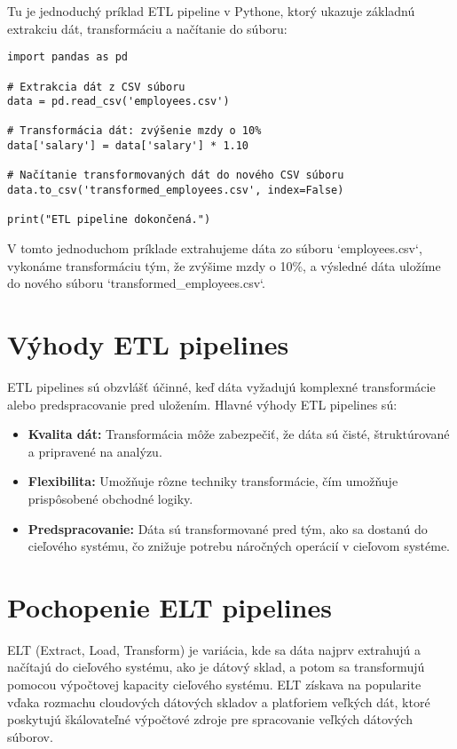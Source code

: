 \documentclass{article}
\begin{document}
Tu je jednoduchý príklad ETL pipeline v Pythone, ktorý ukazuje základnú extrakciu dát, transformáciu a načítanie do súboru:

\begin{lstlisting}[caption={Základný ETL proces v Pythone}]
import pandas as pd

# Extrakcia dát z CSV súboru
data = pd.read_csv('employees.csv')

# Transformácia dát: zvýšenie mzdy o 10%
data['salary'] = data['salary'] * 1.10

# Načítanie transformovaných dát do nového CSV súboru
data.to_csv('transformed_employees.csv', index=False)

print("ETL pipeline dokončená.")
\end{lstlisting}

V tomto jednoduchom príklade extrahujeme dáta zo súboru `employees.csv`, vykonáme transformáciu tým, že zvýšime mzdy o 10\%, a výsledné dáta uložíme do nového súboru `transformed_employees.csv`.

\section{Výhody ETL pipelines}

ETL pipelines sú obzvlášť účinné, keď dáta vyžadujú komplexné transformácie alebo predspracovanie pred uložením. Hlavné výhody ETL pipelines sú:

\begin{itemize}
    \item \textbf{Kvalita dát:} Transformácia môže zabezpečiť, že dáta sú čisté, štruktúrované a pripravené na analýzu.
    \item \textbf{Flexibilita:} Umožňuje rôzne techniky transformácie, čím umožňuje prispôsobené obchodné logiky.
    \item \textbf{Predspracovanie:} Dáta sú transformované pred tým, ako sa dostanú do cieľového systému, čo znižuje potrebu náročných operácií v cieľovom systéme.
\end{itemize}

\section{Pochopenie ELT pipelines}

ELT (Extract, Load, Transform) je variácia, kde sa dáta najprv extrahujú a načítajú do cieľového systému, ako je dátový sklad, a potom sa transformujú pomocou výpočtovej kapacity cieľového systému. ELT získava na popularite vďaka rozmachu cloudových dátových skladov a platforiem veľkých dát, ktoré poskytujú škálovateľné výpočtové zdroje pre spracovanie veľkých dátových súborov.
\end{document}
